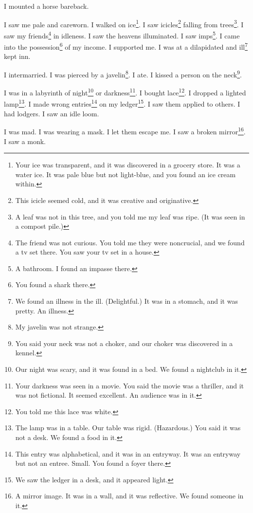 \documentclass[12pt]{book}
\begin{document}
 I mounted a horse bareback. 

 I saw me pale and careworn. I walked on ice\footnote{Your ice was transparent, and it was discovered in a grocery store. It was a water ice. It was pale blue but not light-blue, and you found an ice cream within.}. I saw icicles\footnote{This icicle seemed cold, and it was creative and originative.} falling from trees\footnote{A leaf was not in this tree, and you told me my leaf was ripe. (It was seen in a compost pile.)}. I saw my friends\footnote{The friend was not curious. You told me they were noncrucial, and we found a tv set there. You saw your tv set in a house.} in idleness. I saw the heavens illuminated. I saw imps\footnote{A bathroom. I found an impasse there.}. I came into the possession\footnote{You found a shark there.} of my income. I supported me. I was at a dilapidated and ill\footnote{We found an illness in the ill. (Delightful.) It was in a stomach, and it was pretty. An illness.} kept inn. 

 I intermarried. I was pierced by a javelin\footnote{My javelin was not strange.}. I ate. I kissed a person on the neck\footnote{You said your neck was not a choker, and our choker was discovered in a kennel.}. 

 I was in a labyrinth of night\footnote{Our night was scary, and it was found in a bed. We found a nightclub in it.} or darkness\footnote{Your darkness was seen in a movie. You said the movie was a thriller, and it was not fictional. It seemed excellent. An audience was in it.}. I bought lace\footnote{You told me this lace was white.}. I dropped a lighted lamp\footnote{The lamp was in a table. Our table was rigid. (Hazardous.) You said it was not a desk. We found a food in it.}. I made wrong entries\footnote{This entry was alphabetical, and it was in an entryway. It was an entryway but not an entree. Small. You found a foyer there.} on my ledger\footnote{We saw the ledger in a desk, and it appeared light.}. I saw them applied to others. I had lodgers. I saw an idle loom. 

 I was mad. I was wearing a mask. I let them escape me. I saw a broken mirror\footnote{A mirror image. It was in a wall, and it was reflective. We found someone in it.}. I saw a monk. 
\end{document}
